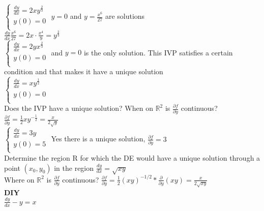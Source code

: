 \documentclass{article}
\begin{document}
\subsection{}
$\begin{cases}
    \frac{dy}{dx} = 2xy^\frac{2}{3}\\
    y(0) = 0  \\
\end{cases}$
$y=0$ and $y=\frac{x^6}{27}$ are solutions \\[0.05in]$\frac{dy}{dx} \frac{x^6}{27} = 2x \cdot \frac{x^4}{9} = y^\frac{2}{3}$
\\[0.05in]$\begin{cases}
    \frac{dy}{dx} = 2yx^\frac{2}{3}\\
    y(0) = 0  \\[0.05in]
\end{cases}$ and $y=0$ is the only solution. This IVP satisfies a certain condition and that makes it have a unique solution
\\[0.05in]$\begin{cases}
    \frac{dy}{dx} = xy^\frac{1}{2}\\
    y(0) = 0  \\
\end{cases}$
\\ Does the IVP have a unique solution? When on $\mathbb{R}^2$ is $\frac{\partial f}{\partial y}$ continuous? $\frac{\partial f }{ \partial y }= \frac{1}{2} xy^{-\frac{1}{2}} = \frac{x}{2\sqrt{y}}$
\\$\begin{cases}
    \frac{dy}{dx} = 3y\\
    y(0) = 5  \\
\end{cases}$ 
Yes there is a unique solution, $\frac{\partial f}{\partial y} = 3$\\
Determine the region R for which the DE would have a unique solution through a point $(x_0, y_0)$ in the region
$\frac{dy}{dx} = \sqrt{xy}$ \\ Where on $\mathbb{R}^2$ is $\frac{\partial f}{\partial y}$ continuous? $\frac{\partial f}{\partial y} = \frac{1}{2}(xy)^{-1/2} * \frac{\partial}{\partial y} (xy) = \frac{x}{2\sqrt{xy}}$
\\ \textbf{DIY}
\\ $\frac{dy}{dx}-y=x$ 
\end{document}
